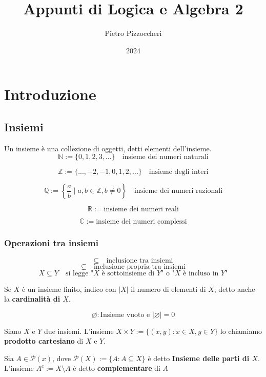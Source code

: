 \documentclass[a4paper,12pt]{article}
\title{Appunti di Logica e Algebra 2}
\author{Pietro Pizzoccheri}
\date{2024}
\begin{document}
\maketitle

\tableofcontents

\section{Introduzione}
\subsection{Insiemi}

Un insieme è una collezione di oggetti, detti elementi dell'insieme.
\[
    \mathbb{N} := \{ 0,1,2,3,...\} \quad \text{insieme dei numeri naturali}
\]

\[
    \mathbb{Z} := \{ ...,-2,-1,0,1,2,...\} \quad \text{insieme degli interi}
\]

\[
    \mathbb{Q} := \left\{ \frac{a}{b} \mid a,b \in \mathbb{Z}, b \neq 0
    \right\} \quad \text{insieme dei numeri razionali}
\]

\[
    \mathbb{R} := \text{insieme dei numeri reali}
\]

\[
    \mathbb{C} := \text{insieme dei numeri complessi}
\]

\subsubsection{Operazioni tra insiemi}

\[
    \subseteq \quad \text{inclusione tra insiemi}
\]
\[
    \subsetneq \quad \text{inclusione propria tra insiemi}
\]
\[
    X \subseteq Y \quad \text{si legge "} X \text{ è sottoinsieme di }Y \text{"
        o "} X \text{ è incluso in } Y\text{"}
\]

\newpage
Se \(X\) è un insieme finito, indico con \(|X|\) il numero di elementi di
\(X\), detto anche la \textbf{cardinalità di \(X\)}.

\[\varnothing : \text{Insieme vuoto e } |\varnothing| = 0\]

Siano \(X\) e \(Y\) due insiemi. L'insieme \begin{math}
    X \times Y := \{ (x,y) : x \in X , y \in Y \}
\end{math} lo chiamiamo \textbf{prodotto cartesiano} di \(X\) e \(Y\).
\vspace{\baselineskip}

Sia \begin{math}
    A \in \mathcal{P} (x)
\end{math}, dove \begin{math}
    \mathcal{P} (X) := \{ A : A \subseteq X \}
\end{math} è detto \textbf{Insieme delle parti di \(X\)}. L'insieme \begin{math}
    A^c := X \setminus A
\end{math} è detto \textbf{complementare} di \(A\)
\end{document}
